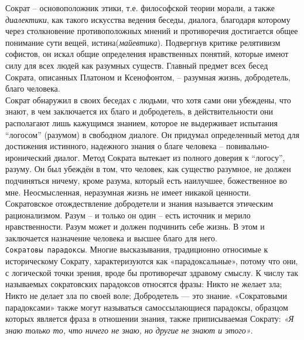 \documentclass[12pt]{article}
\begin{document}
Сократ – основоположник этики, т.е. философской теории морали, а также \textit{диалектики}, как такого искусства
ведения беседы, диалога, благодаря которому через столкновение противоположных мнений и противоречия
достигается общее понимание сути вещей, истина(\textit{майевтика}).
Подвергнув критике релятивизм софистов, он искал общие
определения нравственных понятий, которые имеют силу для всех людей как разумных существ. Главный
предмет всех бесед Сократа, описанных Платоном и Ксенофонтом, – разумная жизнь, добродетель, благо
человека.\\
Сократ обнаружил в своих беседах с людьми, что хотя сами они убеждены, что знают, в чем заключается их
благо и добродетель, в действительности они располагают лишь кажущимся знанием, которое не выдерживает
испытания “логосом” (разумом) в свободном диалоге. Он придумал определенный метод для достижения
истинного, надежного знания о благе человека – повивально-иронический диалог. Метод Сократа вытекает из
полного доверия к “логосу”, разуму. Он был убеждён в том, что человек, как существо разумное, не должен
подчиняться ничему, кроме разума, который есть наилучшее, божественное во мне. Неосмысленная, неразумная
жизнь не имеет никакой ценности. Сократовское отождествление добродетели и знания называется этическим
рационализмом. Разум – и только он один – есть источник и мерило нравственности. Разум может и должен
подчинить себе жизнь. В этом и заключается назначение человека и высшее благо для него.\\
\texttt{Сократовы парадоксы}.
Многие высказывания, традиционно относимые к историческому Сократу, характеризуются как «парадоксальные»,
потому что они, с логической точки зрения, вроде бы противоречат здравому смыслу.
К числу так называемых сократовских парадоксов относятся фразы:
Никто не желает зла;
Никто не делает зла по своей воле;
Добродетель — это знание.
«Сократовыми парадоксами» также могут называться самоссылающиеся парадоксы,
образцом которых является фраза в отношении знания, также приписываемая Сократу:
\textit{«Я знаю только то, что ничего не знаю, но другие не знают и этого»}.


\newpage
\end{document}
